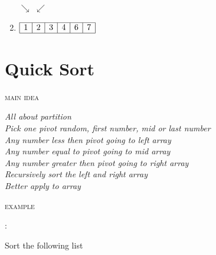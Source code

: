 \documentclass[12pt, letterpaper]{article}
\newcommand{\idea}[1]{
\noindent
\begin{minipage}[t]{0.15\textwidth}
	\textsc{main idea}
\end{minipage}
\hspace{-0.8cm}\vline\hspace{0.05cm}
\begin{minipage}[t]{0.88\textwidth}
	\textit{#1}
\end{minipage}\vspace{0.25cm}}
\newcommand{\example}[1]{
\noindent
\begin{minipage}[t]{0.02\textwidth}
	\textsc{example}
\end{minipage}
\hspace{1.6cm}:\hspace{0.05cm}
\begin{minipage}[t]{0.88\textwidth}
	\textnormal{#1}
\end{minipage}\vspace{0.25cm}}
\begin{document}
\begin{minipage}{0.8\textwidth}
\begin{enumerate}
		\hspace{0.8cm}$\searrow$
		\hspace{0.8cm}$\swarrow$
		\item
		$\begin{array}{|l|c|c|c|c|r|}
			\hline
			1 & 2 & 3 & 4 & 6 & 7 \\
			\hline
		\end{array}$
	\end{enumerate}
\end{minipage}

\section{Quick Sort}
\idea{All about partition\\
	  Pick one pivot random, first number, mid or last number\\
	  Any number less then pivot going to left array\\
	  Any number equal to pivot going to mid array\\
	  Any number greater then pivot going to right array\\
	  Recursively sort the left and right array\\
	  Better apply to array}
\example{Sort the following list}
\end{document}
